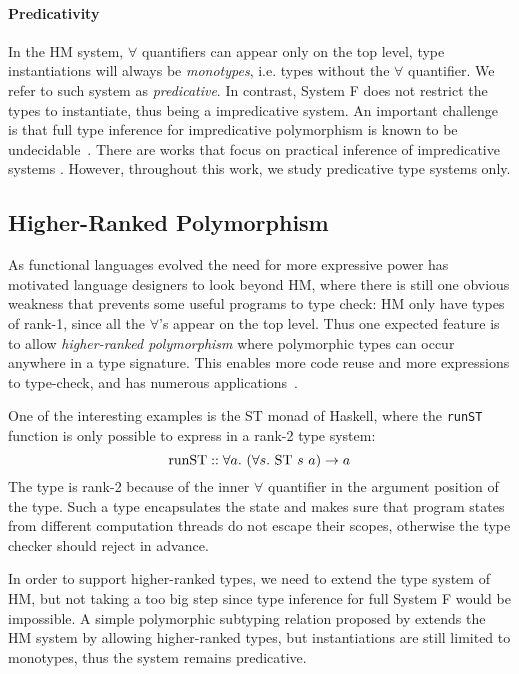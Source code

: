 \paragraph{Predicativity}
In the HM system, $\forall$ quantifiers can appear only on the top level,
type instantiations will always be \emph{monotypes},
i.e. types without the $\forall$ quantifier.
We refer to such system as \emph{predicative}.
In contrast, System F does not restrict the types to instantiate,
thus being a impredicative system.
An important challenge is that full type inference for impredicative
polymorphism is known to be undecidable~\citep{wells1999typability}.
There are works that focus on practical inference of impredicative systems .
However, throughout this work, we study predicative type systems only.

\subsection{Higher-Ranked Polymorphism}
As functional languages evolved the need for more expressive
power has motivated language designers to look beyond HM,
where there is still one obvious weakness that prevents some useful programs to type check:
HM only have types of rank-1, since all the $\forall$'s appear on the top level.
Thus one expected feature is to allow 
\emph{higher-ranked polymorphism} where polymorphic types can
occur anywhere in a type signature.
This enables more code reuse and more expressions to type-check, and has
numerous applications~\citep{jones1995functional,gill1993short,launchbury1995state,lammel2003scrap}.

One of the interesting examples is the ST monad of Haskell,
where the \verb|runST| function is only possible to express in a rank-2 type system:
$$\text{runST} :: \all[a]{(\all[s]{\text{ST}~s~a}) \to a}$$
The type is rank-2 because of the inner $\forall$ quantifier
in the argument position of the type.
Such a type encapsulates the state and makes sure
that program states from different computation threads do not escape their scopes,
otherwise the type checker should reject in advance.

In order to support higher-ranked types, we need to extend the type system of HM,
but not taking a too big step since type inference for full System F would be impossible.
A simple polymorphic subtyping relation
proposed by \citet{odersky1996putting}
extends the HM system by allowing higher-ranked types,
but instantiations are still limited to monotypes,
thus the system remains predicative.

